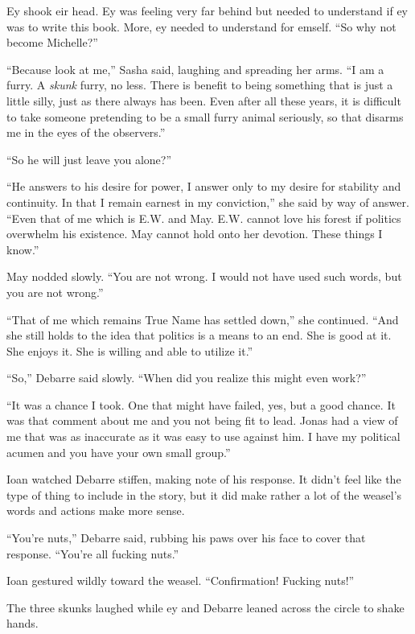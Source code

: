 Ey shook eir head. Ey was feeling very far behind but needed to understand if ey was to write this book. More, ey needed to understand for emself. ``So why not become Michelle?''

``Because look at me,'' Sasha said, laughing and spreading her arms. ``I am a furry. A \emph{skunk} furry, no less. There is benefit to being something that is just a little silly, just as there always has been. Even after all these years, it is difficult to take someone pretending to be a small furry animal seriously, so that disarms me in the eyes of the observers.''

``So he will just leave you alone?''

``He answers to his desire for power, I answer only to my desire for stability and continuity. In that I remain earnest in my conviction,'' she said by way of answer. ``Even that of me which is E.W. and May. E.W. cannot love his forest if politics overwhelm his existence. May cannot hold onto her devotion. These things I know.''

May nodded slowly. ``You are not wrong. I would not have used such words, but you are not wrong.''

``That of me which remains True Name has settled down,'' she continued. ``And she still holds to the idea that politics is a means to an end. She is good at it. She enjoys it. She is willing and able to utilize it.''

``So,'' Debarre said slowly. ``When did you realize this might even work?''

``It was a chance I took. One that might have failed, yes, but a good chance. It was that comment about me and you not being fit to lead. Jonas had a view of me that was as inaccurate as it was easy to use against him. I have my political acumen and you have your own small group.''

Ioan watched Debarre stiffen, making note of his response. It didn't feel like the type of thing to include in the story, but it did make rather a lot of the weasel's words and actions make more sense.

``You're nuts,'' Debarre said, rubbing his paws over his face to cover that response. ``You're all fucking nuts.''

Ioan gestured wildly toward the weasel. ``Confirmation! Fucking nuts!''

The three skunks laughed while ey and Debarre leaned across the circle to shake hands.
